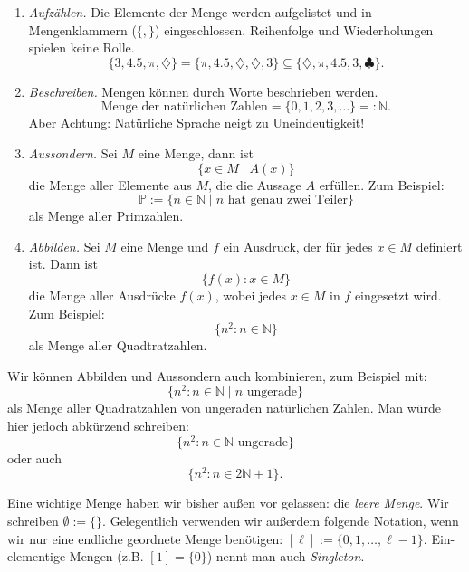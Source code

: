 \documentclass[11pt, a4paper]{article}
\theoremstyle{definition}
\theoremstyle{plain}
\numberwithin{equation}{section}
\begin{document}
\begin{enumerate}
	\item \textit{Aufzählen.} Die Elemente der Menge werden aufgelistet und in Mengenklammern (\( \{, \} \)) eingeschlossen. Reihenfolge und Wiederholungen spielen keine Rolle.
		\[
			\{ 3, 4.5, \pi, \diamondsuit \} = \{ \pi, 4.5, \diamondsuit, \diamondsuit, 3 \} \subseteq \{ \diamondsuit, \pi, 4.5, 3, \clubsuit \}. 
		\]
	\item \textit{Beschreiben.} Mengen können durch Worte beschrieben werden.
		\[
			\text{Menge der natürlichen Zahlen} = \{ 0, 1, 2, 3, \ldots \} =: \mathbb{N}.
		\]
		Aber Achtung: Natürliche Sprache neigt zu Uneindeutigkeit!
	\item \textit{Aussondern.} Sei \( M \) eine Menge, dann ist
		\[
			\{ x \in M \mid A(x) \}
		\]
		die Menge aller Elemente aus \( M \), die die Aussage \( A \) erfüllen. Zum Beispiel:
		\[
			\mathbb{P} := \{ n \in \mathbb{N} \mid n \text{ hat genau zwei Teiler} \}
		\]
		als Menge aller Primzahlen.
	\item \textit{Abbilden.} Sei \( M \) eine Menge und \( f \) ein Ausdruck, der für jedes \( x \in M \) definiert ist. Dann ist
		\[
			\{ f(x) : x \in M \}
		\]
		die Menge aller Ausdrücke \( f(x) \), wobei jedes \( x \in M \) in \( f \) eingesetzt wird. Zum Beispiel:
		\[
			\{ n^2 : n \in \mathbb{N} \}
		\]
		als Menge aller Quadtratzahlen.
\end{enumerate}
Wir können Abbilden und Aussondern auch kombinieren, zum Beispiel mit:
\[
	\{ n^2 : n \in \mathbb{N} \mid n \text{ ungerade} \}
\]
als Menge aller Quadratzahlen von ungeraden natürlichen Zahlen. Man würde hier jedoch abkürzend schreiben:
\[
	\{ n^2 : n \in \mathbb{N} \text{ ungerade} \}
\]
oder auch
\[
	\{ n^2 : n \in 2\mathbb{N}+1 \}.
\]

Eine wichtige Menge haben wir bisher außen vor gelassen: die \textit{leere Menge}. Wir schreiben \( \emptyset := \{ \} \). Gelegentlich verwenden wir außerdem folgende Notation, wenn wir nur eine endliche geordnete Menge benötigen: \( [\ell] := \{ 0, 1, \ldots, \ell-1 \} \). Ein-elementige Mengen (z.B. \( [1] = \{ 0 \} \)) nennt man auch \textit{Singleton}.
\end{document}
